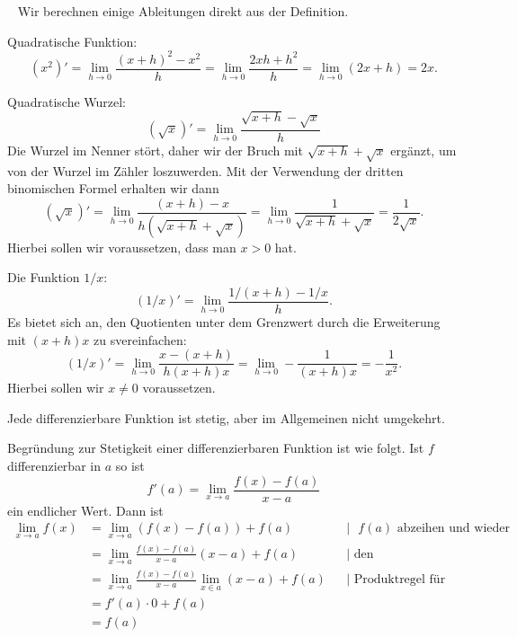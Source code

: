 \begin{bsp} {\ } 
	Wir berechnen einige Ableitungen direkt aus der Definition. 
	\begin{enuma}
	\item Quadratische Funktion: 
	\[
		(x^2)' = \lim_{h \to 0} \frac{(x+h)^2 - x^2}{h} = \lim_{h \to 0} \frac{2 x h + h^2}{h} = \lim_{h \to 0} (2 x  + h) = 2 x. 
	\]
	\item Quadratische Wurzel: 
	\[
		(\sqrt{x})' = \lim_{h \to 0} \frac{\sqrt{x+h} - \sqrt{x}}{h} 
	\]
	Die Wurzel im Nenner stört, daher wir der Bruch mit $\sqrt{x+h} +  \sqrt{x}$ ergänzt, um von der Wurzel im Zähler loszuwerden. Mit der Verwendung der dritten binomischen Formel erhalten wir dann
	\[
		(\sqrt{x})' = \lim_{h \to 0} \frac{ (x+h) - x} { h (\sqrt{x + h} + \sqrt{x}) } = \lim_{h \to 0} \frac{1}{\sqrt{x+h} + \sqrt{x}} = \frac{1}{2 \sqrt{x}}.  
	\]
	Hierbei sollen wir voraussetzen, dass man $x> 0$ hat. 
	\item Die Funktion $1/x$: 
	\[
		(1/x)' = \lim_{h \to 0} \frac{1/(x+h) - 1/x}{h}. 
	\]
	Es bietet sich an, den Quotienten unter dem Grenzwert durch die Erweiterung mit $(x+h) x$ zu svereinfachen: 
	\[
		(1/x)'= \lim_{h \to 0} \frac{ x - (x+h)}{h (x+h) x} = \lim_{h \to 0} - \frac{1}{(x+h) x} =  - \frac{1}{x^2}. 
	\]
	Hierbei sollen wir $x \ne 0$ voraussetzen. 
	\end{enuma} 
\end{bsp} 

\begin{thm}
	Jede differenzierbare Funktion ist stetig, aber im Allgemeinen nicht umgekehrt. 
\end{thm} 

\begin{bem}
	Begründung zur Stetigkeit einer differenzierbaren Funktion ist wie folgt. Ist $f$ differenzierbar in $a$ so ist
	\[
		f'(a) = \lim_{x \to a} \frac{f(x) -f(a)}{x-a}
	\]
	ein endlicher Wert. Dann ist 
	\begin{align*}
		\lim_{x \to a} f(x) & = \lim_{x \to a} (f(x)-f(a)) + f(a)  & &|\text{ $f(a)$ abzeihen und wieder dazu addieren} 
		\\ & = \lim_{x \to a} \frac{f(x)-f(a)}{x-a} (x-a) + f(a)  & &| \text{ den Ableitungsquotienten zu erzeugen}
		\\ & = \lim_{x \to a} \frac{f(x)-f(a)}{x-a} \lim_{x \in a} (x-a) + f(a)  & &|  \text{ Produktregel für Grenzwerte}
		\\ & = f'(a) \cdot 0 + f(a) 
		\\ & = f(a) 
	\end{align*}
\end{bem} 


